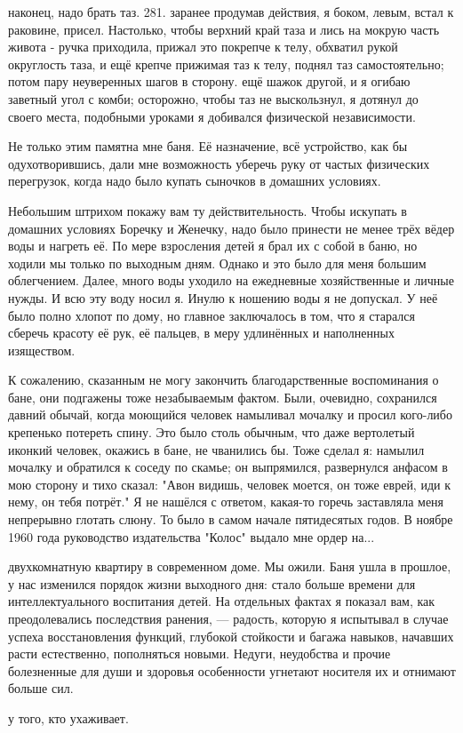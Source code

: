 \label{281-1}
наконец, надо брать таз. 281. заранее продумав действия, я боком, левым, встал к раковине, присел. Настолько, чтобы верхний край таза и лись на мокрую часть живота - ручка приходила, прижал это покрепче к телу, обхватил рукой округлость таза, и ещё крепче прижимая таз к телу, поднял таз самостоятельно; потом пару неуверенных шагов в сторону. ещё шажок другой, и я огибаю заветный угол с комби; осторожно, чтобы таз не выскользнул, я дотянул до своего места, подобными уроками я добивался физической независимости.

Не только этим памятна мне баня. Её назначение, всё устройство, как бы одухотворившись, дали мне возможность уберечь руку от частых физических перегрузок, когда надо было купать сыночков в домашних условиях.

\label{282-1}
Небольшим штрихом покажу вам ту действительность. Чтобы искупать в домашних условиях Боречку и Женечку, надо было принести не менее трёх вёдер воды и нагреть её. По мере взросления детей я брал их с собой в баню, но ходили мы только по выходным дням. Однако и это было для меня большим облегчением. Далее, много воды уходило на ежедневные хозяйственные и личные нужды. И всю эту воду носил я. Инулю к ношению воды я не допускал. У неё было полно хлопот по дому, но главное заключалось в том, что я старался сберечь красоту её рук, её пальцев, в меру удлинённых и наполненных изяществом.

\label{283-1}
К сожалению, сказанным не могу закончить благодарственные воспоминания о бане, они подгажены тоже незабываемым фактом. Были, очевидно, сохранился давний обычай, когда моющийся человек намыливал мочалку и просил кого-либо крепенько потереть спину. Это было столь обычным, что даже вертолетый иконкий человек, окажись в бане, не чванились бы. Тоже сделал я: намылил мочалку и обратился к соседу по скамье; он выпрямился, развернулся анфасом в мою сторону и тихо сказал: "Авон видишь, человек моется, он тоже еврей, иди к нему, он тебя потрёт." Я не нашёлся с ответом, какая-то горечь заставляла меня непрерывно глотать слюну. То было в самом начале пятидесятых годов. В ноябре 1960 года руководство издательства "Колос" выдало мне ордер на...

\label{284-1}
двухкомнатную квартиру в современном доме. Мы ожили. Баня ушла в прошлое, у нас изменился порядок жизни выходного дня: стало больше времени для интеллектуального воспитания детей. На отдельных фактах я показал вам, как преодолевались последствия ранения, — радость, которую я испытывал в случае успеха восстановления функций, глубокой стойкости и багажа навыков, начавших расти естественно, пополняться новыми. Недуги, неудобства и прочие болезненные для души и здоровья особенности угнетают носителя их и отнимают больше сил.

\label{285-1}
у того, кто ухаживает.
